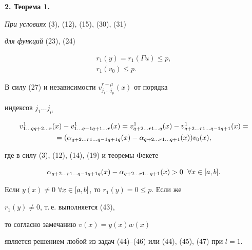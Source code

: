 {\bf 2. Теорема 1.}


{\it При условиях} (3), (12), (15), (30), (31) 


{\it для функций} (23), (24)


\begin{gather}


r_1(y)=r_1(\Gamma u)\le p,\\


r_1(v_0)\le p.


\end{gather}





\setcounter{thm}{1}





\begin{pf}


В силу (27) и независимости $v^{r-\mu}_{j_1\dotsc j_\mu}(x)$ от порядка


индексов $j_1\dotsc j_\mu$


\begin{multline}


v^1_{1\dotsc q q+2\dotsc r}(x)-v^1_{1\dotsc q-1 q+1\dotsc r}(x)=


v^1_{q+2\dotsc r 1\dotsc q}(x)-v^1_{q+2\dotsc r 1\dotsc q-1 q+1}(x)= \\


%


=(\a_{q+2\dotsc r1\dotsc q-1 q+1 q}(x)-\a_{q+2\dotsc r1\dotsc q+1}(x))v_0(x),


\end{multline}


где в силу (3), (12), (14), (19) и теоремы Фекете


\begin{equation}


\a_{q+2\dotsc r 1\dotsc q-1 q+1 q}(x)-\a_{q+2\dotsc r 1\dotsc q+1}(x)>0\ \; 


\forall x\in\ab.


\end{equation}





Если $y(x)\ne 0$ \; $\forall x\in[a,b]$, то $r_1(y)=0\le p$. Если же


$r_1(y)\ne 0$, т.\,е. выполняется (43),


то согласно замечанию $v(x)=y(x)w(x)$


является решением любой из задач (44)--(46) или (44), (45), (47) при $l=1$.






\end{pf}
